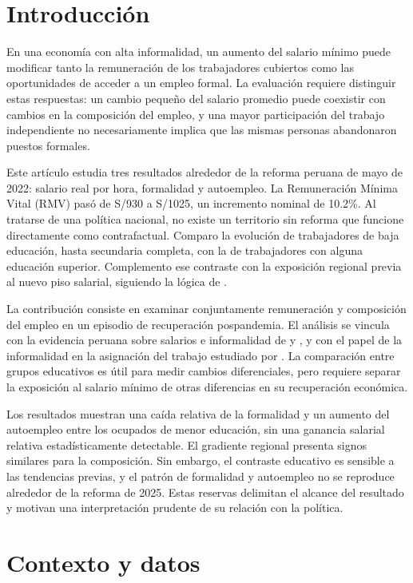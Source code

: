 \section{Introducción}

En una economía con alta informalidad, un aumento del salario mínimo puede modificar tanto la remuneración de los trabajadores cubiertos como las oportunidades de acceder a un empleo formal. La evaluación requiere distinguir estas respuestas: un cambio pequeño del salario promedio puede coexistir con cambios en la composición del empleo, y una mayor participación del trabajo independiente no necesariamente implica que las mismas personas abandonaron puestos formales.

Este artículo estudia tres resultados alrededor de la reforma peruana de mayo de 2022: salario real por hora, formalidad y autoempleo. La Remuneración Mínima Vital (RMV) pasó de S/930 a S/1025, un incremento nominal de 10.2\%. Al tratarse de una política nacional, no existe un territorio sin reforma que funcione directamente como contrafactual. Comparo la evolución de trabajadores de baja educación, hasta secundaria completa, con la de trabajadores con alguna educación superior. Complemento ese contraste con la exposición regional previa al nuevo piso salarial, siguiendo la lógica de \citet{card_1992}.

La contribución consiste en examinar conjuntamente remuneración y composición del empleo en un episodio de recuperación pospandemia. El análisis se vincula con la evidencia peruana sobre salarios e informalidad de \citet{jaramillo_lopez_2006} y \citet{jimenez_2023}, y con el papel de la informalidad en la asignación del trabajo estudiado por \citet{ulyssea_2018}. La comparación entre grupos educativos es útil para medir cambios diferenciales, pero requiere separar la exposición al salario mínimo de otras diferencias en su recuperación económica.

Los resultados muestran una caída relativa de la formalidad y un aumento del autoempleo entre los ocupados de menor educación, sin una ganancia salarial relativa estadísticamente detectable. El gradiente regional presenta signos similares para la composición. Sin embargo, el contraste educativo es sensible a las tendencias previas, y el patrón de formalidad y autoempleo no se reproduce alrededor de la reforma de 2025. Estas reservas delimitan el alcance del resultado y motivan una interpretación prudente de su relación con la política.

\section{Contexto y datos}

